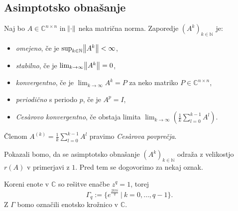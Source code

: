 \documentclass[mat1]{fmfdelo}
\newcommand{\N}{\mathbb N}
\newcommand{\C}{\mathbb C}
\begin{document}
\subsection{Asimptotsko obnašanje}
\begin{definicija}\label{definicijaAsimptotika}
    Naj bo $A \in \C^{n\times n}$ in $\norm{\cdot}$ neka matrična norma. Zaporedje $(A^k)_{k\in\N}$ je:
    \begin{itemize}
        \item \emph{omejeno}, če je $\sup_{k\in \N} \norm{A^k} < \infty$,
        \item \emph{stabilno}, če je $\lim_{k \rightarrow \infty} \norm{A^k} = 0$,
        \item \emph{konvergentno}, če je $\lim_{k \rightarrow \infty} A^k = P$ za neko matriko $P \in \C^{n \times n}$,
        \item \emph{periodično} s periodo $p$, če je $A^p = I$,
        \item \emph{Ces\`arovo konvergentno}, če obstaja limita $\lim_{k \rightarrow \infty} \left(\frac{1}{k}\sum_{l=0}^{k-1} A^l\right)$.
    \end{itemize}
    Členom $A^{(k)} = \frac{1}{k}\sum_{l=0}^{k-1} A^l$ pravimo \emph{Ces\`arova povprečja}.
\end{definicija}
Pokazali bomo, da se asimptotsko obnašanje $(A^k)_{k\in\N}$ odraža z velikostjo $r(A)$ v primerjavi z $1$. Pred tem se dogovorimo za nekaj oznak.

Koreni enote v $\C$ so rešitve enačbe $z^q = 1$, torej
\begin{equation*}
    \Gamma_q := \{e^{\frac{2 k \pi i}{q}}\ |\ k = 0, \ldots, q - 1\}.
\end{equation*}
Z $\Gamma$ bomo označili enotsko krožnico v $\C$.
\end{document}
